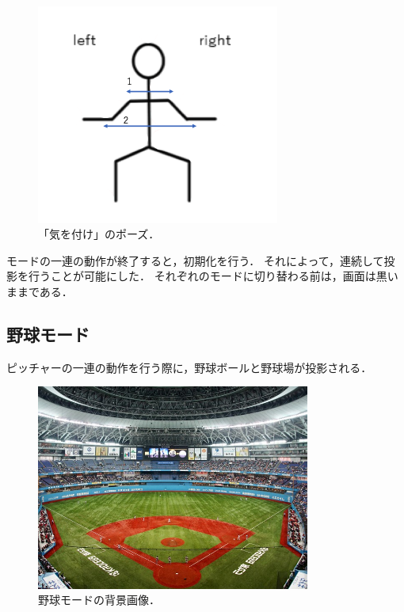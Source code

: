 \vspace{1cm}
\begin{figure}[h]
    \centering
    \includegraphics[width=8cm]{image/kiwotsuke.png}
    \caption[「気を付け」のポーズ]{「気を付け」のポーズ．}
  \label{kiwotsuke}
\end{figure}
\vspace{1cm}

モードの一連の動作が終了すると，初期化を行う．
それによって，連続して投影を行うことが可能にした．
それぞれのモードに切り替わる前は，画面は黒いままである．

\clearpage

\subsection{野球モード}
ピッチャーの一連の動作を行う際に，野球ボールと野球場が投影される．

\vspace{1cm}
\begin{figure}[h]
    \centering
    \includegraphics[width=9cm]{image/baseball_back.jpg}
    \caption[野球モードの背景画像]{野球モードの背景画像\cite{baseballback}．}
  \label{baseballback}
\end{figure}
\vspace{1cm}

